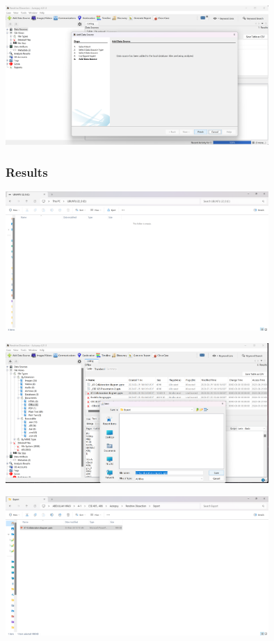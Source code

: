 \documentclass{extarticle}
\begin{document}
\begin{center}
    \includegraphics[width=0.75\textwidth]{4.3/Screenshot (415).png}
\end{center}

\subsubsection*{Results}
\begin{center}
    \includegraphics[width=0.75\textwidth]{4.3/Screenshot (416).png}
\end{center}

\begin{center}
    \includegraphics[width=0.75\textwidth]{4.3/Screenshot (417).png}
\end{center}

\begin{center}
    \includegraphics[width=0.75\textwidth]{4.3/Screenshot (418).png}
\end{center}
\end{document}
